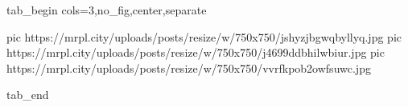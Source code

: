  
 
 
 
 

\ifcmt
  tab_begin cols=3,no_fig,center,separate

     pic https://mrpl.city/uploads/posts/resize/w/750x750/jshyzjbgwqbyllyq.jpg
		 pic https://mrpl.city/uploads/posts/resize/w/750x750/j4699ddbhilwbiur.jpg
		 pic https://mrpl.city/uploads/posts/resize/w/750x750/vvrfkpob2owfsuwc.jpg

  tab_end
\fi
